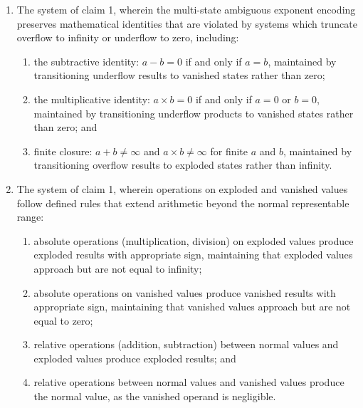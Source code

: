\documentclass[12pt,letter]{article}
\begin{document}
\begin{enumerate}
\newpage
    \item The system of claim 1, wherein the multi-state ambiguous exponent encoding preserves mathematical identities that are violated by systems which truncate overflow to infinity or underflow to zero, including:
        \begin{enumerate}
            \item the subtractive identity: $a - b = 0$ if and only if $a = b$, maintained by transitioning underflow results to vanished states rather than zero;
            \item the multiplicative identity: $a \times b = 0$ if and only if $a = 0$ or $b = 0$, maintained by transitioning underflow products to vanished states rather than zero; and
            \item finite closure: $a + b \neq \infty$ and $a \times b \neq \infty$ for finite $a$ and $b$, maintained by transitioning overflow results to exploded states rather than infinity.
        \end{enumerate}

    \item The system of claim 1, wherein operations on exploded and vanished values follow defined rules that extend arithmetic beyond the normal representable range:
        \begin{enumerate}
            \item absolute operations (multiplication, division) on exploded values produce exploded results with appropriate sign, maintaining that exploded values approach but are not equal to infinity;
            \item absolute operations on vanished values produce vanished results with appropriate sign, maintaining that vanished values approach but are not equal to zero;
            \item relative operations (addition, subtraction) between normal values and exploded values produce exploded results; and
            \item relative operations between normal values and vanished values produce the normal value, as the vanished operand is negligible.
        \end{enumerate}


\end{enumerate}
\end{document}
